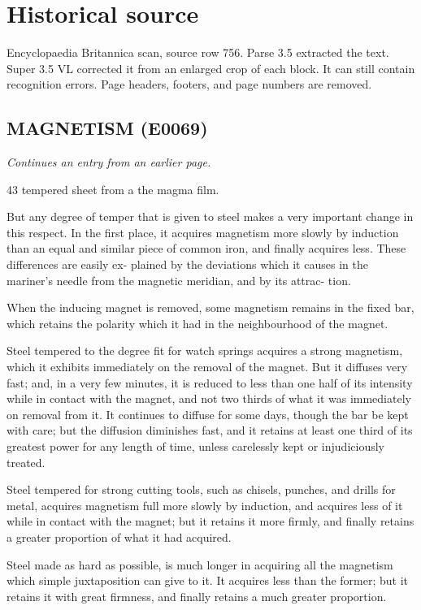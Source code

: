 \documentclass{article}
\begin{document}
\section*{Historical source}
Encyclopaedia Britannica scan, source row 756. Parse 3.5 extracted the text. Super 3.5 VL corrected it from an enlarged crop of each block. It can still contain recognition errors.
Page headers, footers, and page numbers are removed.

\subsection*{MAGNETISM (E0069)}
\textit{Continues an entry from an earlier page.}

43
tempered
sheet
from a
the magma
film.

But any degree of temper that is given to steel makes
a very important change in this respect. In the first
place, it acquires magnetism more slowly by induction
than an equal and similar piece of common iron, and
finally acquires less. These differences are easily ex-
plained by the deviations which it causes in the mariner's
needle from the magnetic meridian, and by its attrac-
tion.

When the inducing magnet is removed, some magnetism remains in the fixed bar, which retains the polarity which it had in the neighbourhood of the magnet.

Steel tempered to the degree fit for watch springs acquires a strong magnetism, which it exhibits immediately on the removal of the magnet. But it diffuses very fast; and, in a very few minutes, it is reduced to less than one half of its intensity while in contact with the magnet, and not two thirds of what it was immediately on removal from it. It continues to diffuse for some days, though the bar be kept with care; but the diffusion diminishes fast, and it retains at least one third of its greatest power for any length of time, unless carelessly kept or injudiciously treated.

Steel tempered for strong cutting tools, such as chisels, punches, and drills for metal, acquires magnetism full more slowly by induction, and acquires less of it while in contact with the magnet; but it retains it more firmly, and finally retains a greater proportion of what it had acquired.

Steel made as hard as possible, is much longer in acquiring all the magnetism which simple juxtaposition can give to it. It acquires less than the former; but it retains it with great firmness, and finally retains a much greater proportion.
\end{document}
